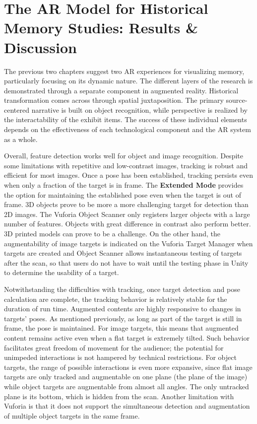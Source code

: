 \chapter[The AR Model for Historical Memory Studies]{The AR Model for Historical Memory Studies: Results \& Discussion}\label{results}
The previous two chapters suggest two AR experiences for visualizing memory, particularly focusing on its dynamic nature. The different layers of the research is demonstrated through a separate component in augmented reality. Historical transformation comes across through spatial juxtaposition. The primary source-centered narrative is built on object recognition, while perspective is realized by the interactability of the exhibit items. The success of these individual elements depends on the effectiveness of each technological component and the AR system as a whole.

Overall, feature detection works well for object and image recognition. Despite some limitations with repetitive and low-contrast images, tracking is robust and efficient for most images. Once a pose has been established, tracking persists even when only a fraction of the target is in frame. The \textbf{Extended Mode} provides the option for maintaining the established pose even when the target is out of frame. 3D objects prove to be more a more challenging target for detection than 2D images. The Vuforia Object Scanner only registers larger objects with a large number of features. Objects with great difference in contrast also perform better. 3D printed models can prove to be a challenge. On the other hand, the augmentability of image targets is indicated on the Vuforia Target Manager when targets are created and Object Scanner allows instantaneous testing of targets after the scan, so that users do not have to wait until the testing phase in Unity to determine the usability of a target.

Notwithstanding the difficulties with tracking, once target detection and pose calculation are complete, the tracking behavior is relatively stable for the duration of run time. Augmented contents are highly responsive to changes in targets' poses. As mentioned previously, as long as part of the target is still in frame, the pose is maintained. For image targets, this means that augmented content remains active even when a flat target is extremely tilted. Such behavior facilitates great freedom of movement for the audience; the potential for unimpeded interactions is not hampered by technical restrictions. For object targets, the range of possible interactions is even more expansive, since flat image targets are only tracked and augmentable on one plane (the plane of the image) while object targets are augmentable from almost all angles. The only untracked plane is its bottom, which is hidden from the scan. Another limitation with Vuforia is that it does not support the simultaneous detection and augmentation of multiple object targets in the same frame.

